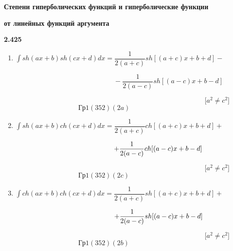 \documentclass[a4paper,10pt]{article}
\begin{document}
\begin{flushleft}
 {\bf Степени гиперболических функций и гиперболические функции}
 
 {\bf от линейных функций аргумента}
 \end{flushleft}
 \begin{flushleft}
 {\bf 2.425}
 \end{flushleft}
\begin{enumerate}
\item \mspace{30mu} $\displaystyle\int sh(ax+b)sh(cx+d)dx=\dfrac{1}{2(a+c)}sh[(a+c)x+b+d]-$
 
 $\displaystyle\mspace{260mu}-\dfrac{1}{2(a-c)}sh[(a-c)x+b-d]$
 
$\mspace{500mu} {[}a^2\neq{c^2}{]}$ $\mspace{166mu}Гр1 (352)(2a)$

\item \mspace{30mu} $\displaystyle\int sh(ax+b)ch(cx+d)dx= \dfrac{1}{2(a+c)}ch[(a+c)x+b+d]+$

$\displaystyle\mspace{260mu+}\dfrac{1}{2(a-c)}ch[(a-c)x+b-d]$

$\mspace{500mu}  {[}a^2\neq{c^2}{]}$ $\mspace{166mu}Гр1 (352)(2c)$

\item \mspace{30mu} $\displaystyle\int ch(ax+b)ch(cx+d)dx= \dfrac{1}{2(a+c)}sh[(a+c)x+b+d]+$

 $\displaystyle\mspace{260mu+}\dfrac{1}{2(a-c)}sh[(a-c)x+b-d]$

$\mspace{500mu}  {[}a^2\neq{c^2}{]}$ $\mspace{166mu}Гр1 (352)(2b)$
\end{enumerate}

 
\end{document}
